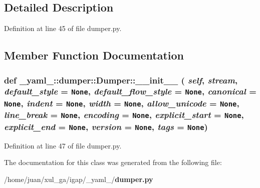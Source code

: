 \subsection{Detailed Description}


Definition at line 45 of file dumper.py.

\subsection{Member Function Documentation}
\subsubsection{\setlength{\rightskip}{0pt plus 5cm}def \_\-yaml\_\-::dumper::Dumper::\_\-\_\-init\_\-\_\- ( {\em self},  {\em stream},  {\em default\_\-style} = {\tt None},  {\em default\_\-flow\_\-style} = {\tt None},  {\em canonical} = {\tt None},  {\em indent} = {\tt None},  {\em width} = {\tt None},  {\em allow\_\-unicode} = {\tt None},  {\em line\_\-break} = {\tt None},  {\em encoding} = {\tt None},  {\em explicit\_\-start} = {\tt None},  {\em explicit\_\-end} = {\tt None},  {\em version} = {\tt None},  {\em tags} = {\tt None})}\label{class__yaml___1_1dumper_1_1Dumper_c3dd834a9a655c86ac94c2987f3a3fc3}




Definition at line 47 of file dumper.py.

The documentation for this class was generated from the following file:\begin{CompactItemize}
\item 
/home/juan/xul\_\-ga/igap/\_\-yaml\_\-/{\bf dumper.py}\end{CompactItemize}
